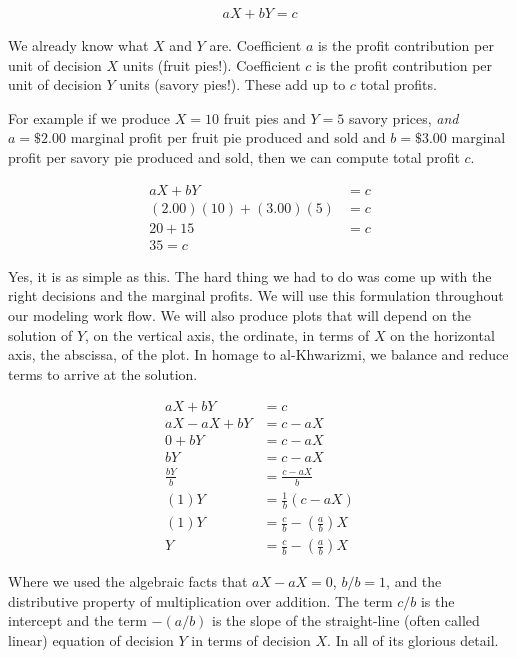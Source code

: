 \documentclass[
]{book}
\begin{document}
\[
\begin{align}
aX + bY = c
\end{align}
\]

We already know what \(X\) and \(Y\) are. Coefficient \(a\) is the profit contribution per unit of decision \(X\) units (fruit pies!). Coefficient \(c\) is the profit contribution per unit of decision \(Y\) units (savory pies!). These add up to \(c\) total profits.

For example if we produce \(X=10\) fruit pies and \(Y=5\) savory prices, \emph{and} \(a=\$2.00\) marginal profit per fruit pie produced and sold and \(b=\$3.00\) marginal profit per savory pie produced and sold, then we can compute total profit \(c\).

\[
\begin{align}
aX + bY &= c \\
(2.00)(10) + (3.00)(5) &= c \\
20 + 15 &= c \\
35 = c
\end{align}
\]

Yes, it is as simple as this. The hard thing we had to do was come up with the right decisions and the marginal profits. We will use this formulation throughout our modeling work flow. We will also produce plots that will depend on the solution of \(Y\), on the vertical axis, the ordinate, in terms of \(X\) on the horizontal axis, the abscissa, of the plot. In homage to al-Khwarizmi, we balance and reduce terms to arrive at the solution.

\[
\begin{align}
aX + bY &= c \\
aX - aX + bY &= c - aX \\
0 + bY &= c - aX \\
bY &= c - aX \\
\frac{bY}{b} &= \frac{c - aX}{b} \\
(1)Y &= \frac{1}{b}(c - aX) \\
(1)Y &= \frac{c}{b} - \left(\frac{a}{b}\right)X \\
Y &= \frac{c}{b} - \left(\frac{a}{b}\right)X
\end{align}
\]

Where we used the algebraic facts that \(aX - aX=0\), \(b/b = 1\), and the distributive property of multiplication over addition. The term \(c/b\) is the intercept and the term \(-(a/b)\) is the slope of the straight-line (often called linear) equation of decision \(Y\) in terms of decision \(X\). In all of its glorious detail.
\end{document}
